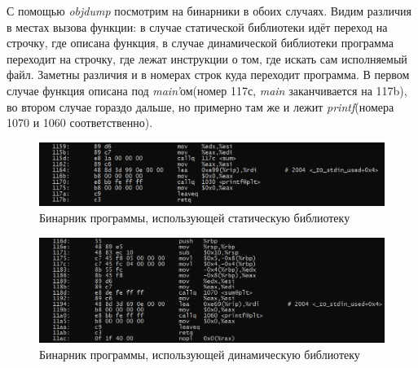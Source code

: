 \documentclass[a4paper,12pt]{article}
\begin{document}
С помощью \textit{objdump} посмотрим на бинарники в обоих случаях. Видим различия в местах вызова функции: в случае статической библиотеки идёт переход на строчку, где описана функция, в случае динамической библиотеки программа переходит на строчку, где лежат инструкции о том, где искать сам исполняемый файл. Заметны различия и в номерах строк куда переходит программа. В первом случае функция описана под \textit{main'}ом(номер 117с, \textit{main} заканчивается на 117b), во втором случае гораздо дальше, но примерно там же и лежит \textit{printf}(номера 1070 и 1060 соответственно).      
\begin{figure}[H]\label{fig: bin stat}
    \centering
    \includegraphics[width = \textwidth]{Бинарник стат библ.png}
    \caption{Бинарник программы, использующей статическую библиотеку}
\end{figure}

\begin{figure}[H]\label{fig: bin dyn}
    \centering
    \includegraphics[width = \textwidth]{Бинарник дин библ.png}
    \caption{Бинарник программы, использующей динамическую библиотеку}
\end{figure}
\end{document}
